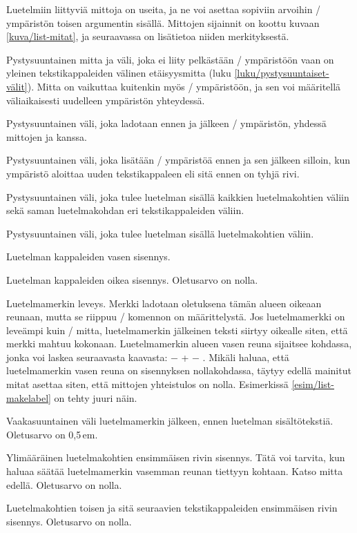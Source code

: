 Luetelmiin liittyviä mittoja on useita, ja ne voi asettaa sopiviin
arvoihin \-/ ympäristön toisen argumentin sisällä.
Mittojen sijainnit on koottu kuvaan \ref{kuva/list-mitat}, ja
seuraavassa on lisätietoa niiden merkityksestä.

\begin{maaritelma}{}
\item [parskip] Pystysuuntainen mitta ja väli, joka ei liity pelkästään
  \-/ ympäristöön vaan on yleinen tekstikappaleiden
  välinen etäisyysmitta (luku \ref{luku/pystysuuntaiset-välit}). Mitta
  on vaikuttaa kuitenkin myös \-/ ympäristöön, ja sen
  voi määritellä väliaikaisesti uudelleen ympäristön yhteydessä.
\item [topsep] Pystysuuntainen väli, joka ladotaan ennen ja jälkeen
  \-/ ympäristön, yhdessä mittojen  ja
   kanssa.
\item [partopsep] Pystysuuntainen väli, joka lisätään
  \-/ ympäristöä ennen ja sen jälkeen silloin, kun
  ympäristö aloittaa uuden tekstikappaleen eli sitä ennen on tyhjä rivi.
\item [parsep] Pystysuuntainen väli, joka tulee luetelman sisällä
  kaikkien luetelmakohtien väliin sekä saman luetelmakohdan eri
  tekstikappaleiden väliin.
\item [itemsep] Pystysuuntainen väli, joka tulee luetelman sisällä
  luetelmakohtien väliin.
\item [leftmargin] Luetelman kappaleiden vasen sisennys.
\item [rightmargin] Luetelman kappaleiden oikea sisennys. Oletusarvo on
  nolla.
\item [labelwidth] Luetelmamerkin leveys. Merkki ladotaan oletuksena
  tämän alueen oikeaan reunaan, mutta se riippuu \-/
  komennon on määrittelystä. Jos luetelmamerkki on leveämpi kuin
  \-/ mitta, luetelmamerkin jälkeinen teksti siirtyy
  oikealle siten, että merkki mahtuu kokonaan. Luetelmamerkin alueen
  vasen reuna sijaitsee kohdassa, jonka voi laskea seuraavasta kaavasta:
   −  +  −
  . Mikäli haluaa, että luetelmamerkin vasen reuna on
  sisennyksen nollakohdassa, täytyy edellä mainitut mitat asettaa siten,
  että mittojen yhteistulos on nolla. Esimerkissä
  \ref{esim/list-makelabel} on tehty juuri näin.
\item [labelsep] Vaakasuuntainen väli luetelmamerkin jälkeen, ennen
  luetelman sisältötekstiä. Oletusarvo on 0,5\,em.
\item [itemindent] Ylimääräinen luetelmakohtien ensimmäisen rivin
  sisennys. Tätä voi tarvita, kun haluaa säätää luetelmamerkin vasemman
  reunan tiettyyn kohtaan. Katso mitta  edellä.
  Oletusarvo on nolla.
\item [listparindent] Luetelmakohtien toisen ja sitä seuraavien
  tekstikappaleiden ensimmäisen rivin sisennys. Oletusarvo on nolla.
\end{maaritelma}

